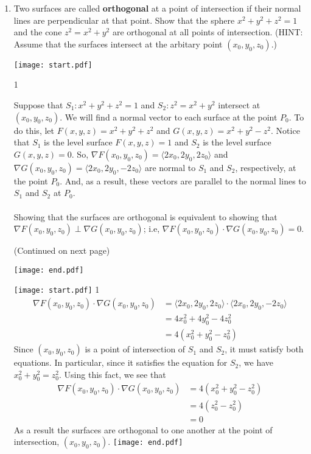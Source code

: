 \documentclass[12pt]{article}
\begin{document}
\begin{enumerate}
\item Two surfaces are called {\bf orthogonal} at a point of intersection if their normal lines are perpendicular at that point.  Show that the sphere $x^2+y^2+z^2=1$ and the cone $z^2=x^2+y^2$ are orthogonal at all points of intersection.  (HINT: Assume that the surfaces intersect at the arbitary point $(x_0,y_0,z_0)$.)

\texttt{[image: start.pdf]}
{{{1\linewidth}{Suppose that $S_1: x^2+y^2+z^2=1$ and $S_2: z^2=x^2+y^2$ intersect at $(x_0,y_0,z_0)$. We will find a normal vector to each surface at the point $P_0$.  To do this, let $F(x,y,z)=x^2+y^2+z^2$ and $G(x,y,z)=x^2+y^2-z^2$.  Notice that $S_1$ is the level surface $F(x,y,z)=1$ and $S_2$ is the level surface $G(x,y,z)=0$.  So, $\nabla F(x_0,y_0,z_0)=\langle 2x_0,2y_0,2z_0\rangle$ and $\nabla G(x_0,y_0,z_0)=\langle 2x_0,2y_0,-2z_0\rangle$ are normal to $S_1$ and $S_2$, respectively, at the point $P_0$.  And, as a result, these vectors are parallel to the normal lines to $S_1$ and $S_2$ at $P_0$.\\
\\
Showing that the surfaces are orthogonal is equivalent to showing that $\nabla F(x_0,y_0,z_0) \perp \nabla G(x_0,y_0,z_0)$; i.e, $\nabla F(x_0,y_0,z_0) \cdot \nabla G(x_0,y_0,z_0)=0$.
\medskip
\begin{center}
(Continued on next page)
\end{center}
}}}
\texttt{[image: end.pdf]}

\texttt{[image: start.pdf]}
{{{1\linewidth}{
\begin{align*}
\nabla F(x_0,y_0,z_0) \cdot \nabla G(x_0,y_0,z_0)&=\langle 2x_0,2y_0,2z_0\rangle\cdot\langle 2x_0,2y_0,-2z_0\rangle\\
&=4x_0^2+4y_0^2-4z_0^2\\
&=4(x_0^2+y_0^2-z_0^2)
\end{align*}
Since $(x_0,y_0,z_0)$ is a point of intersection of $S_1$ and $S_2$, it must satisfy both equations.  In particular, since it satisfies the equation for $S_2$, we have $x_0^2+y_0^2=z_0^2$.  Using this fact, we see that 
\begin{align*}
\nabla F(x_0,y_0,z_0) \cdot \nabla G(x_0,y_0,z_0)&=4(x_0^2+y_0^2-z_0^2)\\
&=4(z_0^2-z_0^2)\\
&=0
\end{align*}
As a result the surfaces are orthogonal to one another at the point of intersection, $(x_0,y_0,z_0)$.
}}}
\texttt{[image: end.pdf]}



\end{enumerate}
\end{document}
